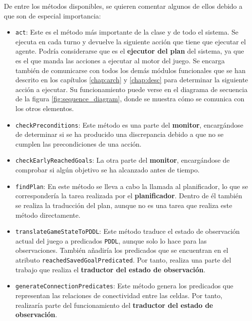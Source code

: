 De entre los métodos disponibles, se quieren comentar algunos de ellos debido a que
son de especial importancia:

\begin{itemize}[label=\textbullet]
    \item \texttt{act}: Este es el método más importante de la clase y de todo el sistema. Se ejecuta
    en cada turno y devuelve la siguiente acción que tiene que ejecutar el agente. Podría considerarse que
    es el \textbf{ejecutor del plan} del sistema, ya que es el que manda las acciones a ejecutar
    al motor del juego. Se encarga también de comunicarse con todos los demás módulos funcionales que se
    han descrito en los capítulos \ref{chap:arch} y \ref{chap:desc} para determinar la siguiente acción a
    ejecutar. Su funcionamiento puede verse en el diagrama de secuencia de la figura \ref{fig:sequence_diagram},
    donde se muestra cómo se comunica con los otros elementos.
    
    \item \texttt{checkPreconditions}: Este método es una parte del \textbf{monitor}, encargándose de
    determinar si se ha producido una discrepancia debido a que no se cumplen las precondiciones
    de una acción.
    
    \item \texttt{checkEarlyReachedGoals}: La otra parte del \textbf{monitor}, encargándose de
    comprobar si algún objetivo se ha alcanzado antes de tiempo.
    
    \item \texttt{findPlan}: En este método se lleva a cabo la llamada al planificador, lo que se
    correspondería la tarea realizada por el \textbf{planificador}. Dentro de él también se realiza
    la traducción del plan, aunque no es una tarea que realiza este método directamente.
    
    \item \texttt{translateGameStateToPDDL}: Este método traduce el estado de observación actual del juego
    a predicados \texttt{PDDL}, aunque solo lo hace para las observaciones. También añadiría los predicados
    que se encuentran en el atributo \texttt{reachedSavedGoalPredicated}. Por tanto, realiza una parte
    del trabajo que realiza el \textbf{traductor del estado de observación}.
    
    \item \texttt{generateConnectionPredicates}: Este método genera los predicados que representan
    las relaciones de conectividad entre las celdas. Por tanto, realizaría parte del funcionamiento
    del \textbf{traductor del estado de observación}.
    

\end{itemize}

